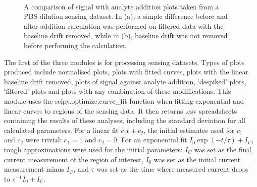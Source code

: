 \documentclass[
  a4paper,
]{scrbook}
\begin{document}
\begin{figure}
\begin{minipage}[t]{0.70\linewidth}
{{}

}

\end{minipage}%
%
\begin{minipage}[t]{0.15\linewidth}

{\centering 

~

}

\end{minipage}%

\caption{\label{fig-spaa-plot-comparison}A comparison of signal with
analyte addition plots taken from a PBS dilution sensing dataset. In
(a), a simple difference before and after addition calculation was
performed on filtered data with the baseline drift removed, while in
(b), baseline drift was not removed before performing the calculation.}

\end{figure}

The first of the three modules is for processing sensing datasets. Types
of plots produced include normalised plots, plots with fitted curves,
plots with the linear baseline drift removed, plots of signal against
analyte addition, `despiked' plots, `filtered' plots and plots with any
combination of these modifications. This module uses the
scipy.optimize.curve\_fit function when fitting exponential and linear
curves to regions of the sensing data. It then returns .csv spreadsheets
containing the results of these analyses, including the standard
deviation for all calculated parameters. For a linear fit
\(c_1t + c_2\), the initial estimates used for \(c_1\) and \(c_2\) were
trivial: \(c_1=1\) and \(c_2=0\). For an exponential fit
\(I_0\exp{(-t/\tau)} + I_C\), rough approximations were used for the
initial parameters: \(I_C\) was set as the final current measurement of
the region of interest, \(I_0\) was set as the initial current
measurement minus \(I_C\), and \(\tau\) was set as the time where
measured current drops to \(e^{-1}I_0 + I_C\).
\end{document}

